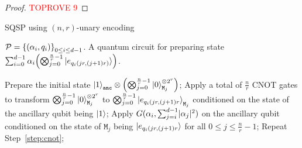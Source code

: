 \documentclass[a4paper,UKenglish,cleveref, autoref, thm-restate]{lipics-v2021}
\DeclarePairedDelimiter\rbra{\lparen}{\rparen}
\DeclarePairedDelimiter\cbra{\{}{\}}
\DeclarePairedDelimiter\abs{\lvert}{\rvert}
\begin{document}
\begin{proof}\textcolor{red}{TOPROVE 9}\end{proof}

\begin{algorithm}[htbp]
    \caption{SQSP using $(n, r)$-unary encoding}\label{alg:unary} 
    \begin{algorithmic}[1]
    \REQUIRE $ \mathcal{P} = \cbra*{\rbra*{\alpha_i, q_i}}_{0\leq i \leq d-1}$.
    \ENSURE A quantum circuit for preparing state $\sum_{i=0}^{d-1} \alpha_i \rbra*{\bigotimes_{j=0}^{\frac{n}{r}-1} \ket{e_{q_i(jr, (j+1)r)}}}$.

   \STATE  Prepare the initial state $\ket{1}_{\texttt{anc}} \otimes \rbra*{\bigotimes_{j=0}^{\frac{n}{r}-1}\ket{0}^{\otimes 2^r}_{\texttt{M}_j}}$;
    \STATE Apply a total of $\frac{n}{r}$ CNOT gates to transform $\bigotimes_{j=0}^{\frac{n}{r}-1}\ket{0}^{\otimes 2^r}_{\texttt{M}_j}$ to $\bigotimes_{j=0}^{\frac{n}{r}-1}\ket{e_{q_i(jr, (j+1)r}}_{\texttt{M}_j}$ conditioned on the state of the ancillary qubit being $\ket{1}$; \label{step:cnot}
    \STATE Apply $G(\alpha_i, \sum_{j=i}^{d-1}\abs{\alpha_j}^2)$ on the ancillary qubit conditioned on the state of $\texttt{M}_j$ being $\ket{e_{q_i(jr, (j+1)r}}$ for all $0 \leq j \leq \frac{n}{r}-1$;
    \STATE Repeat Step~\ref{step:cnot};
    \ENDFOR
    \end{algorithmic}
\end{algorithm}
\end{document}
